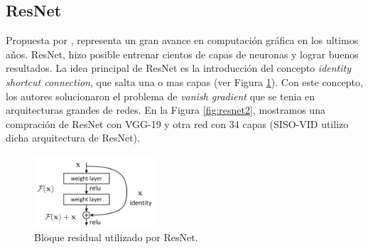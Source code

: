 \documentclass{article}
\begin{document}
	\subsection{ResNet}

	Propuesta por \cite{he2016deep}, representa un gran avance en computación gráfica en los ultimos años. ResNet, hizo posible entrenar cientos de capas de neuronas y lograr buenos resultados. La idea principal de ResNet es la introducción del concepto \textit{identity shortcut connection}, que salta una o mas capas (ver Figura \ref{fig:resnet1}). Con este concepto, los autores solucionaron el problema de \textit{vanish gradient} que se tenia en arquitecturas grandes de redes. En la Figura \ref{fig:resnet2}, mostramos una compración de ResNet con VGG-19 y otra red con 34 capas (SISO-VID utilizo dicha arquitectura de ResNet).

	\begin{figure}[H]
		\centering
		\includegraphics[width=0.4\textwidth]{img/resnet1}		
		\caption{Bloque residual utilizado por ResNet.}
		\label{fig:resnet1}
	\end{figure} 
\end{document}
